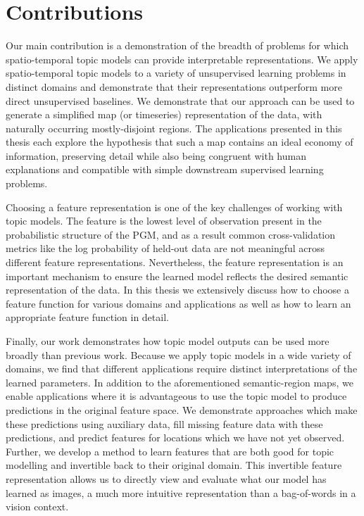 \section{Contributions}
Our main contribution is a demonstration of the breadth of problems for which spatio-temporal topic models can provide interpretable representations.   We apply spatio-temporal topic models to a variety of unsupervised learning problems in distinct domains and demonstrate that their representations outperform more direct unsupervised baselines. We demonstrate that our approach can be used to generate a simplified map (or timeseries) representation of the data, with naturally occurring mostly-disjoint regions. The applications presented in this thesis each explore the hypothesis that such a map contains an ideal economy of information, preserving detail while also being congruent with human explanations and compatible with simple downstream supervised learning problems.

Choosing a feature representation is one of the key challenges of working with topic models. The feature is the lowest level of observation present in the probabilistic structure of the PGM, and as a result common cross-validation metrics like the log probability of held-out data are not meaningful across different feature representations. Nevertheless, the feature representation is an important mechanism to ensure the learned model reflects the desired semantic representation of the data. In this thesis we extensively discuss how to choose a feature function for various domains and applications as well as how to learn an appropriate feature function in detail.

Finally, our work demonstrates how topic model outputs can be used more broadly than previous work. Because we apply topic models in a wide variety of domains, we find that different applications require distinct interpretations of the learned parameters. In addition to the aforementioned semantic-region maps, we enable applications where it is advantageous to use the topic model to produce predictions in the original feature space. We demonstrate approaches which make these predictions using auxiliary data, fill missing feature data with these predictions, and predict features for locations which we have not yet observed. Further, we develop a method to learn features that are both good for topic modelling and invertible back to their original domain. This invertible feature representation allows us to directly view and evaluate what our model has learned as images, a much more intuitive representation than a bag-of-words in a vision context.

